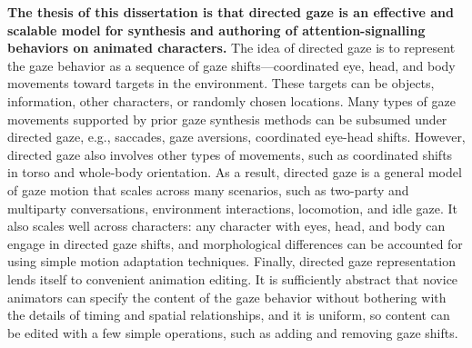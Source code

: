 \textbf{The thesis of this dissertation is that directed gaze is an effective and scalable model for synthesis and authoring of attention-signalling behaviors on animated characters.} The idea of directed gaze is to represent the gaze behavior as a sequence of gaze shifts---coordinated eye, head, and body movements toward targets in the environment. These targets can be objects, information, other characters, or randomly chosen locations. Many types of gaze movements supported by prior gaze synthesis methods can be subsumed under directed gaze, e.g., saccades, gaze aversions, coordinated eye-head shifts. However, directed gaze also involves other types of movements, such as coordinated shifts in torso and whole-body orientation. As a result, directed gaze is a general model of gaze motion that scales across many scenarios, such as two-party and multiparty conversations, environment interactions, locomotion, and idle gaze. It also scales well across characters: any character with eyes, head, and body can engage in directed gaze shifts, and morphological differences can be accounted for using simple motion adaptation techniques. Finally, directed gaze representation lends itself to convenient animation editing. It is sufficiently abstract that novice animators can specify the content of the gaze behavior without bothering with the details of timing and spatial relationships, and it is uniform, so content can be edited with a few simple operations, such as adding and removing gaze shifts.

